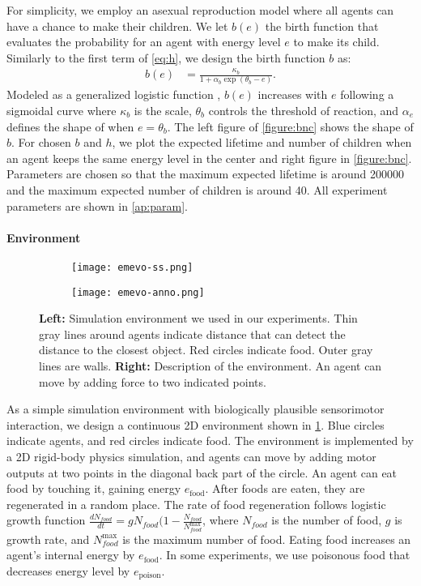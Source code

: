 For simplicity, we employ an asexual reproduction model where all agents can have a chance to make their children. We let $b(e)$ the birth function that evaluates the probability for an agent with energy level $e$ to make its child. Similarly to the first term of \cref{eq:h}, we design the birth function $b$ as:
\begin{align}
 b(e) &=  \frac{\kappa_{b}}{1 + \alpha_{b}\exp(\theta_{b} - e)}. \label{eq:b}
\end{align}
Modeled as a generalized logistic function \citep{richardsFlexibleGrowthFunction1959}, $b(e)$ increases with $e$ following a sigmoidal curve where $\kappa_{b}$ is the scale, $\theta_{b}$ controls the threshold of reaction, and $\alpha_{e}$ defines the shape of when $e = \theta_{b}$. The left figure of \cref{figure:bnc} shows the shape of $b$. For chosen $b$ and $h$, we plot the expected lifetime and number of children when an agent keeps the same energy level in the center and right figure in \cref{figure:bnc}. Parameters are chosen so that the maximum expected lifetime is around \num{200000} and the maximum expected number of children is around 40. All experiment parameters are shown in \cref{ap:param}.

\paragraph{Environment}

\begin{figure}[t]
  \begin{subfigure}[t]{6cm}
    \centering
    \texttt{[image: emevo-ss.png]}
  \end{subfigure}
  \begin{subfigure}[t]{8cm}
    \centering
    \texttt{[image: emevo-anno.png]}
  \end{subfigure}
  \caption{
    \textbf{Left:} Simulation environment we used in our experiments. Thin gray lines around agents indicate distance that can detect the distance to the closest object. Red circles indicate food. Outer gray lines are walls.
    \textbf{Right:} Description of the environment. An agent can move by adding force to two indicated points.
  }\label{figure:env}
\end{figure}

As a simple simulation environment with biologically plausible sensorimotor interaction, we design a continuous 2D environment shown in \cref{figure:env}. Blue circles indicate agents, and red circles indicate food. The environment is implemented by a 2D rigid-body physics simulation, and agents can move by adding motor outputs at two points in the diagonal back part of the circle. An agent can eat food by touching it, gaining energy $e_{\mathrm{food}}$. After foods are eaten, they are regenerated in a random place. The rate of food regeneration follows logistic growth function $\frac{dN_{food}}{dt} = g N_{food} (1 - \frac{N_{food}}{N_{food}^{\mathrm{max}}}$, where $N_{food}$ is the number of food, $g$ is growth rate, and $N_{food}^{\mathrm{max}}$ is the maximum number of food. Eating food increases an agent's internal energy by $e_{\mathrm{food}}$. In some experiments, we use poisonous food that decreases energy level by $e_{\mathrm{poison}}$.

